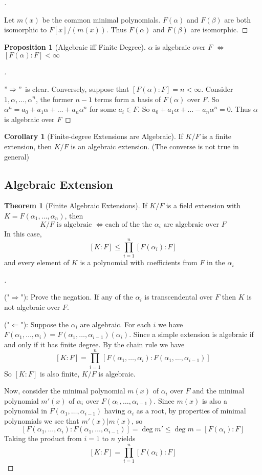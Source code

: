 \documentclass{article}
\theoremstyle{definition}
\newtheorem{thm}{Theorem}
\newtheorem{cor}{Corollary}
\newtheorem{prop}{Proposition}
\newenvironment{proofs}[1][\proofname]{%
  \begin{proof}[#1]$ $\par\nobreak\ignorespaces
}{%
  \end{proof}
}
\begin{document}
\begin{proofs}
	Let $m(x)$ be the common minimal polynomials.
	$F(\alpha)$ and $F(\beta)$ are both isomorphic to $F[x]/(m(x))$. Thus $F(\alpha)$ and $F(\beta)$ are isomorphic.
\end{proofs}

\begin{prop}[Algebraic iff Finite Degree]
	$\alpha$ is algebraic over $F$ $\Leftrightarrow$ $[F(\alpha):F]<\infty$
\end{prop}

\begin{proofs}
	$"\Rightarrow"$ is clear. Conversely, suppose that $[F(\alpha):F]=n<\infty$. Consider $1,\alpha,\dots,\alpha^n$, the former $n-1$ terms form a basis of $F(\alpha)$ over $F$. So $\alpha^n=a_0+a_1\alpha+\dots+a_n\alpha^n$ for some $a_i\in F$. So $a_0+a_1\alpha+\dots-a_n\alpha^n=0$. Thus $\alpha$ is algebraic over $F$
\end{proofs}

\begin{cor}[Finite-degree Extensions are Algebraic]
	If $K/F$ is a finite extension, then $K/F$ is an algebraic extension. (The converse is not true in general)
\end{cor}

\subsection{Algebraic Extension}
\begin{thm}[Finite Algebraic Extensions]
	If $K/F$ is a field extension with $K=F(\alpha_1,\dots,\alpha_n)$, then
	\[K/F\text{ is algebraic }\iff \text{each of the the } \alpha_i \text{ are algebraic over } F\]
	In this case,
	\[[K:F]\le\prod_{i=1}^n [F(\alpha_i):F]\]
	and every element of $K$ is a polynomial with coefficients from $F$ in the $\alpha_i$
\end{thm}

\begin{proofs}
	("$\Rightarrow$"): Prove the negation. If any of the $\alpha_i$ is transcendental over $F$ then $K$ is not algebraic over $F$.

	("$\Leftarrow$"): Suppose the $\alpha_i$ are algebraic. For each $i$ we have $F(\alpha_1,\dots,\alpha_i)=F(\alpha_1,\dots,\alpha_{i-1})(\alpha_i)$. Since a simple extension is algebraic if and only if it has finite degree. By the chain rule we have
	\[[K:F]=\prod_{i=1}^n [F(\alpha_1,\dots,\alpha_i):F(\alpha_1,\dots,\alpha_{i-1})]\]
	So $[K:F]$ is also finite, $K/F$ is algebraic.

	Now, consider the minimal polynomial $m(x)$ of $\alpha_i$ over $F$ and the minimal polynomial $m'(x)$ of $\alpha_i$ over $F(\alpha_1,\dots,\alpha_{i-1})$. Since $m(x)$ is also a polynomial in $F(\alpha_1,\dots,\alpha_{i-1})$ having $\alpha_i$ as a root, by properties of minimal polynomials we see that $m'(x)|m(x)$, so
	\[
		[F(\alpha_1,\dots,\alpha_i):F(\alpha_1,\dots,\alpha_{i-1})]=\deg m' \le \deg m = [F(\alpha_i):F]
	\]
	Taking the product from $i=1$ to $n$ yields
	\[[K:F]=\prod_{i=1}^n [F(\alpha_i):F]\]
\end{proofs}
\end{document}
